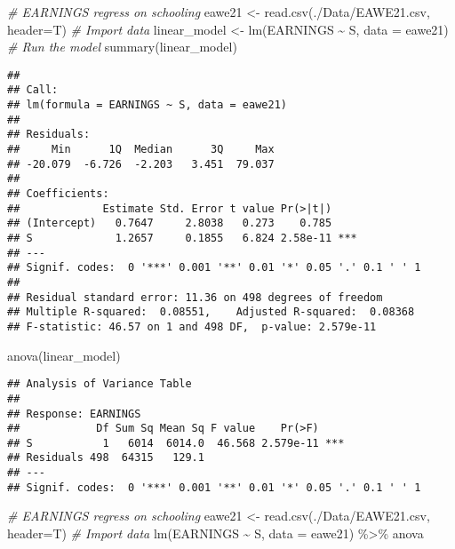\documentclass[
]{article}
\newenvironment{Shaded}{\begin{snugshade}}{\end{snugshade}}
\newcommand{\AttributeTok}[1]{\textcolor[rgb]{0.77,0.63,0.00}{#1}}
\newcommand{\CommentTok}[1]{\textcolor[rgb]{0.56,0.35,0.01}{\textit{#1}}}
\newcommand{\FunctionTok}[1]{\textcolor[rgb]{0.00,0.00,0.00}{#1}}
\newcommand{\NormalTok}[1]{#1}
\newcommand{\OtherTok}[1]{\textcolor[rgb]{0.56,0.35,0.01}{#1}}
\newcommand{\SpecialCharTok}[1]{\textcolor[rgb]{0.00,0.00,0.00}{#1}}
\newcommand{\StringTok}[1]{\textcolor[rgb]{0.31,0.60,0.02}{#1}}
\begin{document}
\begin{Shaded}
\begin{Highlighting}[]
\CommentTok{\# EARNINGS regress on schooling}
\NormalTok{eawe21 }\OtherTok{\textless{}{-}} \FunctionTok{read.csv}\NormalTok{(}\StringTok{\textquotesingle{}./Data/EAWE21.csv\textquotesingle{}}\NormalTok{, }\AttributeTok{header=}\NormalTok{T)   }\CommentTok{\# Import data}
\NormalTok{linear\_model }\OtherTok{\textless{}{-}} \FunctionTok{lm}\NormalTok{(EARNINGS }\SpecialCharTok{\textasciitilde{}}\NormalTok{ S, }\AttributeTok{data =}\NormalTok{ eawe21)     }\CommentTok{\# Run the model}
\FunctionTok{summary}\NormalTok{(linear\_model)}
\end{Highlighting}
\end{Shaded}

\begin{verbatim}
## 
## Call:
## lm(formula = EARNINGS ~ S, data = eawe21)
## 
## Residuals:
##     Min      1Q  Median      3Q     Max 
## -20.079  -6.726  -2.203   3.451  79.037 
## 
## Coefficients:
##             Estimate Std. Error t value Pr(>|t|)    
## (Intercept)   0.7647     2.8038   0.273    0.785    
## S             1.2657     0.1855   6.824 2.58e-11 ***
## ---
## Signif. codes:  0 '***' 0.001 '**' 0.01 '*' 0.05 '.' 0.1 ' ' 1
## 
## Residual standard error: 11.36 on 498 degrees of freedom
## Multiple R-squared:  0.08551,    Adjusted R-squared:  0.08368 
## F-statistic: 46.57 on 1 and 498 DF,  p-value: 2.579e-11
\end{verbatim}

\begin{Shaded}
\begin{Highlighting}[]
\FunctionTok{anova}\NormalTok{(linear\_model)}
\end{Highlighting}
\end{Shaded}

\begin{verbatim}
## Analysis of Variance Table
## 
## Response: EARNINGS
##            Df Sum Sq Mean Sq F value    Pr(>F)    
## S           1   6014  6014.0  46.568 2.579e-11 ***
## Residuals 498  64315   129.1                      
## ---
## Signif. codes:  0 '***' 0.001 '**' 0.01 '*' 0.05 '.' 0.1 ' ' 1
\end{verbatim}

\begin{Shaded}
\begin{Highlighting}[]
\CommentTok{\# EARNINGS regress on schooling}
\NormalTok{eawe21 }\OtherTok{\textless{}{-}} \FunctionTok{read.csv}\NormalTok{(}\StringTok{\textquotesingle{}./Data/EAWE21.csv\textquotesingle{}}\NormalTok{, }\AttributeTok{header=}\NormalTok{T)   }\CommentTok{\# Import data}
\FunctionTok{lm}\NormalTok{(EARNINGS }\SpecialCharTok{\textasciitilde{}}\NormalTok{ S, }\AttributeTok{data =}\NormalTok{ eawe21) }\SpecialCharTok{\%\textgreater{}\%}
\NormalTok{  anova}
\end{Highlighting}
\end{Shaded}
\end{document}
